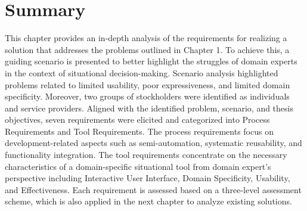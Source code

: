 \vspace{-15pt}
\hypertarget{sec:requirements.summary}{%
\section{Summary}\label{sec:requirements.summary}}
\vspace{15pt}

This chapter provides an in-depth analysis of the requirements for realizing a solution that addresses the problems outlined in Chapter 1. To achieve this, a guiding scenario is presented to better highlight the struggles of domain experts in the context of situational decision-making. Scenario analysis highlighted problems related to limited usability, poor expressiveness, and limited domain specificity. Moreover, two groups of stockholders were identified as individuals and service providers. Aligned with the identified problem, scenario, and thesis objectives, seven requirements were elicited and categorized into Process Requirements and Tool Requirements. The process requirements focus on development-related aspects such as semi-automation, systematic reusability, and functionality integration. The tool requirements concentrate on the necessary characteristics of a domain-specific situational tool from domain expert’s perspective including Interactive User Interface, Domain Specificity, Usability, and Effectiveness. Each requirement is assessed based on a three-level assessment scheme, which is also applied in the next chapter to analyze existing solutions. 